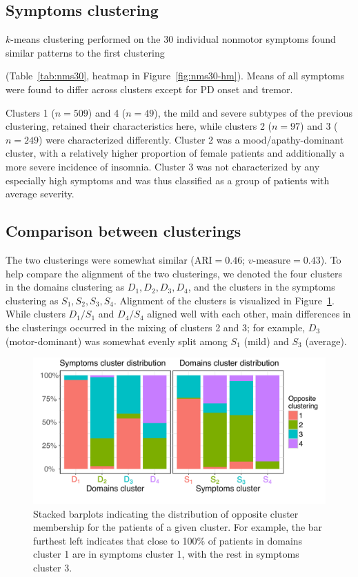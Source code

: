 \documentclass[preprint,5p]{elsarticle} %
\begin{document}
\subsection{Symptoms clustering}

$k$-means clustering performed on the 30 individual nonmotor symptoms found similar patterns to the
first clustering {(Table~\ref{tab:nms30}, heatmap in Figure~\ref{fig:nms30-hm}). Means of all
symptoms were found to differ across clusters except for PD onset and tremor.

Clusters 1 ($n = 509$) and 4 ($n = 49$), the mild and severe subtypes of the previous clustering,
retained their characteristics here, while clusters 2 ($n = 97$) and 3 ($n = 249$) were
characterized differently.
Cluster 2 was a mood/apathy-dominant cluster, with a relatively higher proportion of female patients and
additionally a more severe incidence of insomnia. Cluster 3 was not characterized by any especially high
symptoms and was thus classified as a group of patients with average severity.

\subsection{Comparison between clusterings}

 The two clusterings were somewhat similar ($\text{ARI} = 0.46$; $\text{$v$-measure} = 0.43$). To
 help compare the alignment of the two clusterings, we denoted the four clusters in the domains
 clustering as $D_1, D_2, D_3, D_4$, and the clusters in the symptoms clustering as $S_1, S_2, S_3,
 S_4$.
Alignment of the clusters is visualized in Figure~\ref{fig:align}. While clusters $D_1/S_1$ and
$D_4/S_4$
aligned well with each other, main differences in the clusterings occurred in the mixing of
clusters 2 and 3; for example, $D_3$ (motor-dominant) was somewhat
evenly split among $S_1$ (mild) and $S_3$ (average).}

\begin{figure}[H]
  \centering
  \includegraphics[width=\linewidth]{cluster-alignment.pdf}
  \caption{Stacked barplots indicating the distribution of opposite cluster membership for the patients of
  a given cluster. For example, the bar furthest left indicates that close to 100\% of patients in
domains cluster 1 are in symptoms cluster 1, with the rest in symptoms cluster 3.}
  \label{fig:align}
\end{figure}
\end{document}
